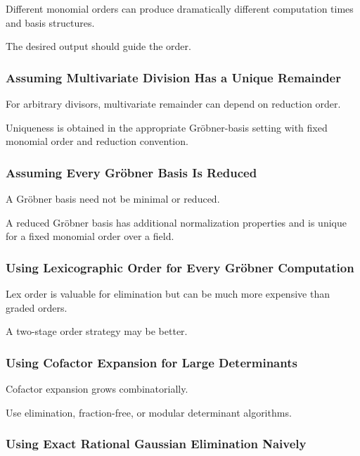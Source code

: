 Different monomial orders can produce dramatically different computation
times and basis structures.

The desired output should guide the order.

\subsubsection{Assuming Multivariate Division Has a Unique Remainder}

For arbitrary divisors, multivariate remainder can depend on reduction
order.

Uniqueness is obtained in the appropriate Gröbner-basis setting with fixed
monomial order and reduction convention.

\subsubsection{Assuming Every Gröbner Basis Is Reduced}

A Gröbner basis need not be minimal or reduced.

A reduced Gröbner basis has additional normalization properties and is
unique for a fixed monomial order over a field.

\subsubsection{Using Lexicographic Order for Every Gröbner Computation}

Lex order is valuable for elimination but can be much more expensive than
graded orders.

A two-stage order strategy may be better.

\subsubsection{Using Cofactor Expansion for Large Determinants}

Cofactor expansion grows combinatorially.

Use elimination, fraction-free, or modular determinant algorithms.

\subsubsection{Using Exact Rational Gaussian Elimination Naively}

